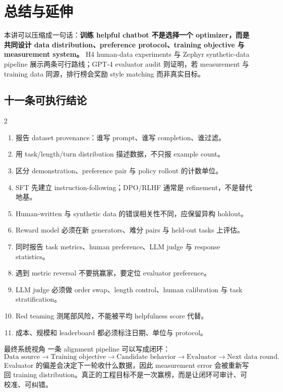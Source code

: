 \section{总结与延伸}

本讲可以压缩成一句话：\textbf{训练 helpful chatbot 不是选择一个 optimizer，而是共同设计 data distribution、preference protocol、training objective 与 measurement system。} H4 human-data experiments 与 Zephyr synthetic-data pipeline 展示两条可行路线；GPT-4 evaluator audit 则证明，若 measurement 与 training data 同源，排行榜会奖励 style matching 而非真实目标。

\subsection{十一条可执行结论}

\begingroup
\footnotesize
\setlength{\columnsep}{1.2em}
\begin{multicols}{2}
\begin{enumerate}[itemsep=0.05em,topsep=0.1em,parsep=0pt,leftmargin=*]
  \item 报告 dataset provenance：谁写 prompt、谁写 completion、谁过滤。
  \item 用 task/length/turn distribution 描述数据，不只报 example count。
  \item 区分 demonstration、preference pair 与 policy rollout 的计数单位。
  \item SFT 先建立 instruction-following；DPO/RLHF 通常是 refinement，不是替代地基。
  \item Human-written 与 synthetic data 的错误相关性不同，应保留异构 holdout。
  \item Reward model 必须在新 generators、难分 pairs 与 held-out tasks 上评估。
  \item 同时报告 task metrics、human preference、LLM judge 与 response statistics。
  \item 遇到 metric reversal 不要挑赢家，要定位 evaluator preference。
  \item LLM judge 必须做 order swap、length control、human calibration 与 task stratification。
  \item Red teaming 测尾部风险，不能被平均 helpfulness score 代替。
  \item 成本、规模和 leaderboard 都必须标注日期、单位与 protocol。
\end{enumerate}
\end{multicols}
\endgroup

\begin{importantbox}{最终系统视角}
一条 alignment pipeline 可以写成闭环：
\[
\text{Data source}\rightarrow\text{Training objective}\rightarrow\text{Candidate behavior}
\rightarrow\text{Evaluator}\rightarrow\text{Next data round}.
\]
Evaluator 的偏差会决定下一轮收什么数据，因此 measurement error 会被重新写回 training distribution。真正的工程目标不是一次赢榜，而是让闭环可审计、可校准、可纠错。
\end{importantbox}

